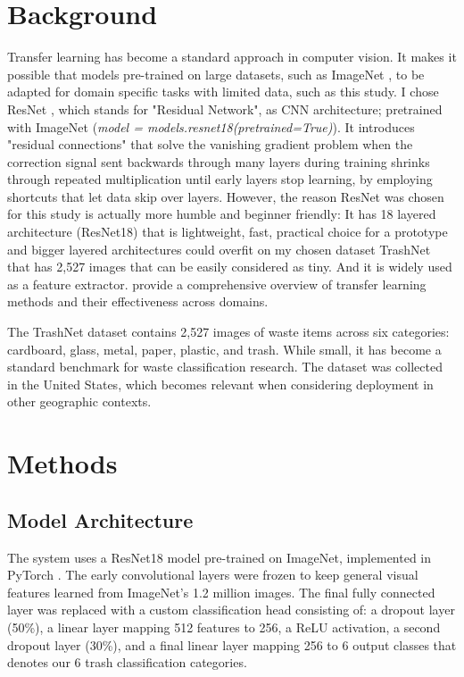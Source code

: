 \documentclass[11pt,a4paper]{article}
\begin{document}
\section{Background}

Transfer learning has become a standard approach in computer vision\citep{panda2024transfer}. It makes it possible that models pre-trained on large datasets, such as ImageNet \citep{deng2009imagenet}, to be adapted for domain specific tasks with limited data, such as this study. I chose ResNet \citep{he2015deep}, which stands for "Residual Network", as CNN architecture; pretrained with ImageNet (\textit{model = models.resnet18(pretrained=True)}). It introduces "residual connections" that solve the vanishing gradient problem when the correction signal sent backwards through many layers during training shrinks through repeated multiplication until early layers stop learning, by employing shortcuts that let data skip over layers. However, the reason ResNet was chosen for this study is actually more humble and beginner friendly: It has 18 layered architecture (ResNet18) that is lightweight, fast, practical choice for a prototype and bigger layered architectures could overfit on my chosen dataset TrashNet that has 2,527 images that can be easily considered as tiny. And it is widely used as a feature extractor.  \citet{pan2010survey} provide a comprehensive overview of transfer learning methods and their effectiveness across domains.

The TrashNet dataset \citep{thung2016trashnet} contains 2,527 images of waste items across six categories: cardboard, glass, metal, paper, plastic, and trash. While small, it has become a standard benchmark for waste classification research\citep{aral2018classification}. The dataset was collected in the United States, which becomes relevant when considering deployment in other geographic contexts.

\section{Methods}

\subsection{Model Architecture}

The system uses a ResNet18 model \citep{he2015deep} pre-trained on ImageNet, implemented in PyTorch \citep{paszke2019pytorch}. The early convolutional layers were frozen to keep general visual features learned from ImageNet's 1.2 million images. The final fully connected layer was replaced with a custom classification head consisting of: a dropout layer (50\%), a linear layer mapping 512 features to 256, a ReLU activation, a second dropout layer (30\%), and a final linear layer mapping 256 to 6 output classes that denotes our 6 trash classification categories.
\end{document}
